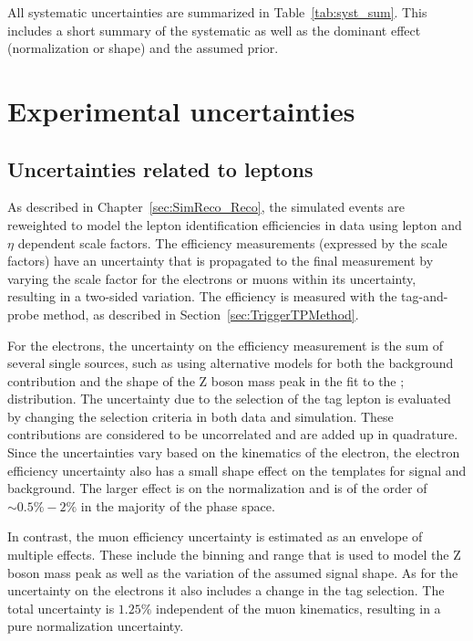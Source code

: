 All systematic uncertainties are summarized in Table~\ref{tab:syst_sum}. This includes a short summary of the systematic as well as the dominant effect (normalization or shape) and
the assumed prior.

\section{Experimental uncertainties}
\label{sec:exp_uncert}

\subsection{Uncertainties related to leptons}

As described in Chapter~\ref{sec:SimReco_Reco}, the simulated events are reweighted to model the lepton identification efficiencies in data using lepton \pt and $\eta$ dependent scale factors. The efficiency measurements (expressed by the scale factors) have an uncertainty that is propagated to the final measurement by varying the scale factor for the electrons or muons within its uncertainty, resulting in a two-sided variation.
The efficiency is measured with the tag-and-probe method, as described in Section~\ref{sec:TriggerTPMethod}.

For the electrons, the uncertainty on the efficiency measurement is the sum of several single sources, such as using alternative models for both the background contribution
and the shape of the Z boson mass peak in the fit to the \mll; distribution.
The uncertainty due to the selection of the tag lepton is evaluated by changing the selection criteria in both data and simulation.
These contributions are considered to be uncorrelated and are added up in quadrature. 
Since the uncertainties vary based on the kinematics of the electron, the electron efficiency uncertainty also has a small shape effect on the templates for signal and background. The larger effect
is on the normalization and is of the order of $\sim 0.5\% - 2\%$ in the majority of the phase space.

In contrast, the muon efficiency uncertainty is estimated as an envelope of multiple effects. These include the binning and range that is used to model the Z boson mass peak as well as the variation of the assumed signal shape. As for the uncertainty on the electrons it also includes a change in the tag selection.
The total uncertainty is $1.25\%$ independent of the muon kinematics, resulting in a pure normalization uncertainty.


